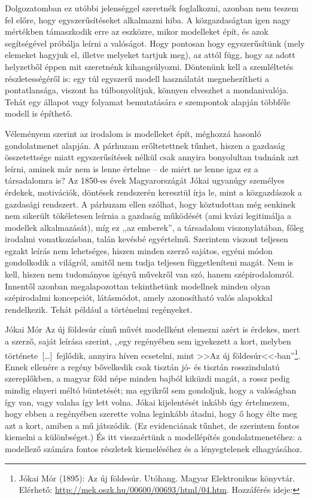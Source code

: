 \documentclass{thesis-ekf}
\begin{document}
    Dolgozatomban ez utóbbi jelenséggel szeretnék foglalkozni, azonban nem teszem fel előre, hogy egyszerűsítéseket
        alkalmazni hiba.
    A közgazdaságtan igen nagy mértékben támaszkodik erre az eszközre, mikor modelleket épít, és azok segítségével
        próbálja leírni a valóságot.
    Hogy pontosan hogy egyszerűsítünk (mely elemeket hagyjuk el, illetve melyeket tartjuk meg), az attól függ,
        hogy az adott helyzetből éppen mit szeretnénk kihangsúlyozni.
    Döntenünk kell a szemléltetés részletességéről is: egy túl egyszerű modell használatát megnehezítheti a
        pontatlansága, viszont ha túlbonyolítjuk, könnyen elveszhet a mondanivalója.
    Tehát egy állapot vagy folyamat bemutatására e szempontok alapján többféle modell is építhető.

    Véleményem szerint az irodalom is modelleket épít, méghozzá hasonló gondolatmenet alapján.
    A párhuzam erőltetettnek tűnhet, hiszen a gazdaság összetettsége miatt egyszerűsítések nélkül csak annyira
        bonyolultan tudnánk azt leírni, aminek már nem is lenne értelme – de miért ne lenne igaz ez a társadalomra is?
    Az 1850-es évek Magyarországát Jókai ugyanúgy személyes érdekek, motivációk, döntések rendszerén keresztül írja le,
        mint a közgazdászok a gazdasági rendszert.
    A párhuzam ellen szólhat, hogy köztudottan még senkinek nem sikerült tökéletesen leírnia a gazdaság működését
        (ami kvázi legitimálja a modellek alkalmazását), míg ez ,,az emberek'', a társadalom viszonylatában,
        főleg irodalmi vonatkozásban, talán kevésbé egyértelmű.
    Szerintem viszont teljesen egzakt leírás nem lehetséges, hiszen minden szerző sajátos, egyéni módon gondolkodik
        a világról, amitől nem tudja teljesen függetleníteni magát.
    Nem is kell, hiszen nem tudományos igényű művekről van szó, hanem szépirodalomról.
    Innentől azonban megalapozottan tekinthetünk modellnek minden olyan szépirodalmi koncepciót, látásmódot,
        amely azonosítható valós alapokkal rendelkezik.
    Tehát például a történelmi regényeket.

    Jókai Mór Az új földesúr című művét modellként elemezni azért is érdekes, mert a szerző, saját leírása szerint,
        ,,egy regényében sem igyekezett a kort, melyben története~[\dots]~fejlődik, annyira híven ecsetelni,
        mint >>Az új földesúr<<-ban''\footnote{Jókai Mór (1895): Az új földesúr. Utóhang. Magyar Elektronikus könyvtár.
            Elérhető: \url{http://mek.oszk.hu/00600/00693/html/04.htm}.
            Hozzáférés ideje: }.
    Ennek ellenére a regény bővelkedik csak tisztán jó- és tisztán rosszindulatú szereplőkben, a magyar föld népe
        minden bajból kiküzdi magát, a rossz pedig mindig elnyeri méltó büntetését;
        ma egyikről sem gondoljuk, hogy a valóságban így van, vagy valaha így lett volna.
    Jókai kijelentését inkább úgy értelmezem, hogy ebben a regényében szerette volna leginkább átadni,
        hogy ő hogy élte meg azt a kort, amiben a mű játszódik.
    (Ez evidenciának tűnhet, de szerintem fontos kiemelni a különbséget.)
    És itt visszaértünk a modellépítés gondolatmenetéhez: a modellező számára fontos részletek kiemeléséhez
        és a lényegtelenek elhagyásához.
\end{document}
